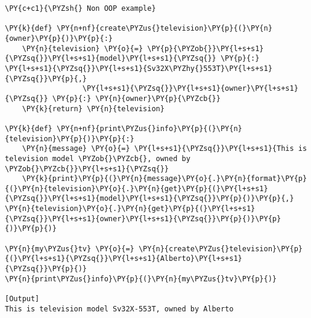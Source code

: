 \begin{Verbatim}[label=\makebox{\url{https://bitbucket.org/lbaldini/programming/src/tip/snippets/non\_oop\_example.py}},commandchars=\\\{\}]
\PY{c+c1}{\PYZsh{} Non OOP example}

\PY{k}{def} \PY{n+nf}{create\PYZus{}television}\PY{p}{(}\PY{n}{owner}\PY{p}{)}\PY{p}{:}
    \PY{n}{television} \PY{o}{=} \PY{p}{\PYZob{}}\PY{l+s+s1}{\PYZsq{}}\PY{l+s+s1}{model}\PY{l+s+s1}{\PYZsq{}} \PY{p}{:} \PY{l+s+s1}{\PYZsq{}}\PY{l+s+s1}{Sv32X\PYZhy{}553T}\PY{l+s+s1}{\PYZsq{}}\PY{p}{,}
                  \PY{l+s+s1}{\PYZsq{}}\PY{l+s+s1}{owner}\PY{l+s+s1}{\PYZsq{}} \PY{p}{:} \PY{n}{owner}\PY{p}{\PYZcb{}}
    \PY{k}{return} \PY{n}{television}
                  
\PY{k}{def} \PY{n+nf}{print\PYZus{}info}\PY{p}{(}\PY{n}{television}\PY{p}{)}\PY{p}{:}
    \PY{n}{message} \PY{o}{=} \PY{l+s+s1}{\PYZsq{}}\PY{l+s+s1}{This is television model \PYZob{}\PYZcb{}, owned by \PYZob{}\PYZcb{}}\PY{l+s+s1}{\PYZsq{}}
    \PY{k}{print}\PY{p}{(}\PY{n}{message}\PY{o}{.}\PY{n}{format}\PY{p}{(}\PY{n}{television}\PY{o}{.}\PY{n}{get}\PY{p}{(}\PY{l+s+s1}{\PYZsq{}}\PY{l+s+s1}{model}\PY{l+s+s1}{\PYZsq{}}\PY{p}{)}\PY{p}{,} \PY{n}{television}\PY{o}{.}\PY{n}{get}\PY{p}{(}\PY{l+s+s1}{\PYZsq{}}\PY{l+s+s1}{owner}\PY{l+s+s1}{\PYZsq{}}\PY{p}{)}\PY{p}{)}\PY{p}{)}

\PY{n}{my\PYZus{}tv} \PY{o}{=} \PY{n}{create\PYZus{}television}\PY{p}{(}\PY{l+s+s1}{\PYZsq{}}\PY{l+s+s1}{Alberto}\PY{l+s+s1}{\PYZsq{}}\PY{p}{)}
\PY{n}{print\PYZus{}info}\PY{p}{(}\PY{n}{my\PYZus{}tv}\PY{p}{)}

[Output]
This is television model Sv32X-553T, owned by Alberto
\end{Verbatim}